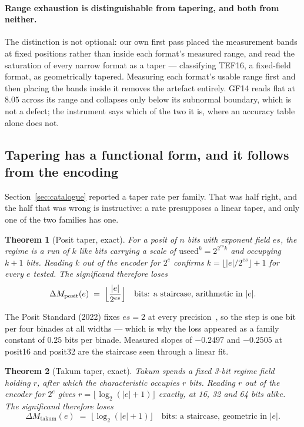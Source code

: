 \documentclass[11pt]{article}
\newtheorem{theorem}{Theorem}
\theoremstyle{definition}
\begin{document}
\paragraph{Range exhaustion is distinguishable from tapering, and both from
neither.} The distinction is not optional: our own first pass placed the
measurement bands at fixed positions rather than inside each format's measured
range, and read the saturation of every narrow format as a taper --- classifying
TEF16, a fixed-field format, as geometrically tapered. Measuring each format's
usable range first and then placing the bands inside it removes the artefact
entirely. GF14 reads flat at $8.05$ across its range and collapses only below its
subnormal boundary, which is not a defect; the instrument says which of the two it
is, where an accuracy table alone does not.


\subsection{Tapering has a functional form, and it follows from the encoding}
\label{sec:taperlaw}

Section~\ref{sec:catalogue} reported a taper rate per family. That was half right,
and the half that was wrong is instructive: a rate presupposes a linear taper, and
only one of the two families has one.

\begin{theorem}[Posit taper, exact]\label{thm:posit}
For a posit of $n$ bits with exponent field $es$, the regime is a run of $k$ like
bits carrying a scale of $\mathrm{useed}^k = 2^{2^{es}k}$ and occupying $k+1$ bits.
Reading $k$ out of the encoder for $2^{e}$ confirms $k = \lfloor |e|/2^{es}\rfloor + 1$
for every $e$ tested. The significand therefore loses
\[
  \Delta M_{\text{posit}}(e) \;=\; \Bigl\lfloor \frac{|e|}{2^{es}} \Bigr\rfloor
  \quad\text{bits: a staircase, arithmetic in } |e| .
\]
\end{theorem}

The Posit Standard (2022) fixes $es = 2$ at every precision~\cite{gustafson}, so
the step is one bit per four binades at all widths --- which is why the loss
appeared as a family constant of $0.25$ bits per binade. Measured slopes of
$-0.2497$ and $-0.2505$ at posit16 and posit32 are the staircase seen through a
linear fit.

\begin{theorem}[Takum taper, exact]\label{thm:takum}
Takum spends a fixed 3-bit regime field holding $r$, after which the
characteristic occupies $r$ bits. Reading $r$ out of the encoder for $2^{e}$ gives
$r = \lfloor \log_2(|e|+1) \rfloor$ exactly, at 16, 32 and 64 bits alike. The
significand therefore loses
\[
  \Delta M_{\text{takum}}(e) \;=\; \bigl\lfloor \log_2(|e|+1) \bigr\rfloor
  \quad\text{bits: a staircase, geometric in } |e| .
\]
\end{theorem}
\end{document}
